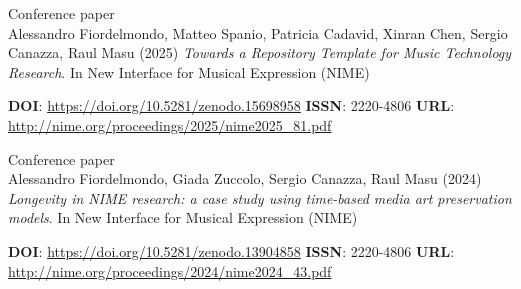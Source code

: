 \documentclass[7pt,a4paper]{article}
\begin{document}
\begin{mdframed}[
    backgroundcolor=white,
    linecolor=white,
    linewidth=0pt,
    innerleftmargin=6pt,
    innerrightmargin=6pt,
    innertopmargin=6pt,
    innerbottommargin=6pt,
    skipabove=0pt,
    skipbelow=0pt
]

\scriptsize Conference paper\\
\normalsize Alessandro Fiordelmondo, Matteo Spanio, Patricia Cadavid, Xinran Chen, Sergio Canazza, Raul Masu
(2025) \textit{Towards a Repository Template for Music Technology Research}.
In
New Interface for Musical Expression (NIME)

\vspace{0.1cm}
\scriptsize  \textbf{DOI}: \href{https://doi.org/10.5281/zenodo.15698958}{https://doi.org/10.5281/zenodo.15698958}
\scriptsize 
\scriptsize  \textbf{ISSN}: 2220-4806 
\scriptsize  \textbf{URL}: \href{http://nime.org/proceedings/2025/nime2025_81.pdf}{http://nime.org/proceedings/2025/nime2025\_81.pdf}
\vspace{0.15cm}
\end{mdframed}




\begin{mdframed}[
    backgroundcolor=entrygray,
    linecolor=entrygray,
    linewidth=0pt,
    innerleftmargin=6pt,
    innerrightmargin=6pt,
    innertopmargin=6pt,
    innerbottommargin=6pt,
    skipabove=0pt,
    skipbelow=0pt
]

\scriptsize Conference paper\\
\normalsize Alessandro Fiordelmondo, Giada Zuccolo, Sergio Canazza, Raul Masu
(2024) \textit{Longevity in NIME research: a case study using time-based media art preservation models}.
In
New Interface for Musical Expression (NIME)

\vspace{0.1cm}
\scriptsize  \textbf{DOI}: \href{https://doi.org/10.5281/zenodo.13904858}{https://doi.org/10.5281/zenodo.13904858}
\scriptsize 
\scriptsize  \textbf{ISSN}: 2220-4806 
\scriptsize  \textbf{URL}: \href{http://nime.org/proceedings/2024/nime2024_43.pdf}{http://nime.org/proceedings/2024/nime2024\_43.pdf}
\vspace{0.15cm}
\end{mdframed}
\end{document}
